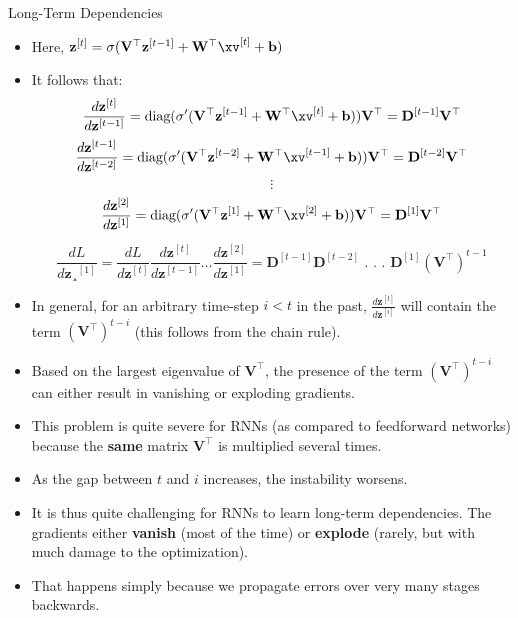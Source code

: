 \begin{vbframe}{Long-Term Dependencies}
  
  \begin{itemize}
    \item Here, $\mathbf{z}^{[t]} = \sigma(\mathbf{V}^\top \mathbf{z}^{[t-1]} + \mathbf{W}^\top \xv^{[t]} + \mathbf{b})$
    \item It follows that:
    $$ \frac{d \mathbf{z}^{[t]}}{d\mathbf{z}^{[t-1]}} = \text{diag}(\sigma' (\mathbf{V}^\top \mathbf{z}^{[t-1]} + \mathbf{W}^\top \xv^{[t]} + \mathbf{b})) \mathbf{V}^\top = \mathbf{D}^{[t-1]} \mathbf{V}^\top $$
    $$ \frac{d \mathbf{z}^{[t-1]}}{d\mathbf{z}^{[t-2]}} = \text{diag}(\sigma' (\mathbf{V}^\top \mathbf{z}^{[t-2]} + \mathbf{W}^\top \xv^{[t-1]} + \mathbf{b})) \mathbf{V}^\top= \mathbf{D}^{[t-2]} \mathbf{V}^\top $$
    $$ \vdots $$
    $$ \frac{d \mathbf{z}^{[2]}}{d\mathbf{z}^{[1]}} = \text{diag}(\sigma' (\mathbf{V}^\top \mathbf{z}^{[1]} + \mathbf{W}^\top \xv^{[2]} + \mathbf{b})) \mathbf{V}^\top = \mathbf{D}^{[1]} \mathbf{V}^\top $$
    
    $$ \frac{d L}{d \mathbf{z}¸^{[1]}} = \frac{d L}{d \mathbf{z}^{[t]}} \frac{d \mathbf{z}^{[t]}}{d \mathbf{z}^{[t-1]}} \dots \frac{d \mathbf{z}^{[2]}}{d \mathbf{z}^{[1]}} = \mathbf{D}^{[t-1]} \mathbf{D}^{[t-2]}   \text{ . . . } \mathbf{D}^{[1]} (\mathbf{V}^\top)^{t-1}$$
    \item In general, for an arbitrary time-step $i<t$ in the past, $\frac{d\mathbf{z}^{[t]}}{d\mathbf{z}^{[i]}}$ will contain the term $(\mathbf{V}^\top)^{t-i}$ (this follows from the chain rule).
    \item Based on the largest eigenvalue of $\mathbf{V}^\top$, the presence of the term $(\mathbf{V}^\top)^{t-i}$ can either result in vanishing or exploding gradients.
    \item This problem is quite severe for RNNs (as compared to feedforward networks) because the \textbf{same} matrix $\mathbf{V}^\top$ is multiplied several times. \href{https://tinyurl.com/vangrad}{}
    \item As the gap between $t$ and $i$ increases, the instability worsens.
    \item It is thus quite challenging for RNNs to learn long-term dependencies. The gradients either \textbf{vanish} (most of the time) or \textbf{explode} (rarely, but with much damage to the optimization).
    \item That happens simply because we propagate errors over very many stages backwards.
  \end{itemize}
  

\end{vbframe}

